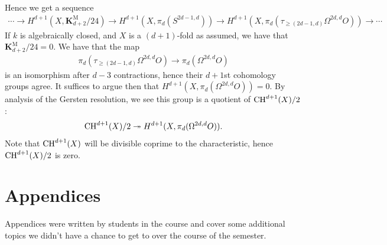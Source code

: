 \documentclass[11pt,openany]{book}
\providecommand{\KM}{\mathbf{K}^\mathrm{M}}
\begin{document}
Hence we get a sequence
\begin{align*}
    \cdots \to H^{d+1}(X,\KM_{d+2}/24) \to H^{d+1}(X, \pi_d(S^{2d-1,d})) \to H^{d+1}(X, \pi_d(\tau_{\ge(2d-1,d)}\Omega^{2d,d}O)) \to \cdots 
\end{align*}
If $k$ is algebraically closed, and $X$ is a $(d+1)$-fold as assumed, we have that $\KM_{d+2}/24 = 0$. We have that the map
\begin{align*}
    \pi_d(\tau_{\ge(2d-1,d)}\Omega^{2d,d}O) \to \pi_d(\Omega^{2d,d}O)
\end{align*}
is an isomorphism after $d-3$ contractions, hence their $d+1$st cohomology groups agree. It suffices to argue then that $H^{d+1}(X,\pi_d(\Omega^{2d,d}O)) = 0$. By analysis of the Gersten resolution, we see this group is a quotient of $\mathrm{CH}^{d+1}(X)/2$:
\begin{align*}
    \mathrm{CH}^{d+1}(X)/2 \twoheadrightarrow H^{d+1}(X, \pi_d(\Omega^{2d,d}O)).
\end{align*}
Note that $\mathrm{CH}^{d+1}(X)$ will be divisible coprime to the characteristic, hence $\mathrm{CH}^{d+1}(X)/2$ is zero.


\chapter{Appendices}
Appendices were written by students in the course and cover some additional topics we didn't have a chance to get to over the course of the semester.






\printbibliography
\end{document}
